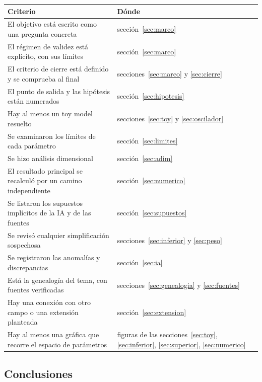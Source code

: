 \documentclass[11pt]{article}
\begin{document}
\begin{table}[H]
\centering
\small
\begin{tabular}{@{}L{9.0cm}L{4.5cm}@{}}
\toprule
\textbf{Criterio} & \textbf{Dónde}\\
\midrule
El objetivo está escrito como una pregunta concreta & sección~\ref{sec:marco}\\
El régimen de validez está explícito, con sus límites & sección~\ref{sec:marco}\\
El criterio de cierre está definido y se comprueba al final & secciones~\ref{sec:marco} y \ref{sec:cierre}\\
El punto de salida y las hipótesis están numerados & sección~\ref{sec:hipotesis}\\
Hay al menos un toy model resuelto & secciones~\ref{sec:toy} y \ref{sec:oscilador}\\
Se examinaron los límites de cada parámetro & sección~\ref{sec:limites}\\
Se hizo análisis dimensional & sección~\ref{sec:adim}\\
El resultado principal se recalculó por un camino independiente & sección~\ref{sec:numerico}\\
Se listaron los supuestos implícitos de la IA y de las fuentes & sección~\ref{sec:supuestos}\\
Se revisó cualquier simplificación sospechosa & secciones~\ref{sec:inferior} y \ref{sec:peso}\\
Se registraron las anomalías y discrepancias & sección~\ref{sec:ia}\\
Está la genealogía del tema, con fuentes verificadas & secciones~\ref{sec:genealogia} y \ref{sec:fuentes}\\
Hay una conexión con otro campo o una extensión planteada & sección~\ref{sec:extension}\\
Hay al menos una gráfica que recorre el espacio de parámetros & figuras de las secciones~\ref{sec:toy}, \ref{sec:inferior}, \ref{sec:superior}, \ref{sec:numerico}\\
\bottomrule
\end{tabular}
\end{table}

\subsection{Conclusiones}
\end{document}
